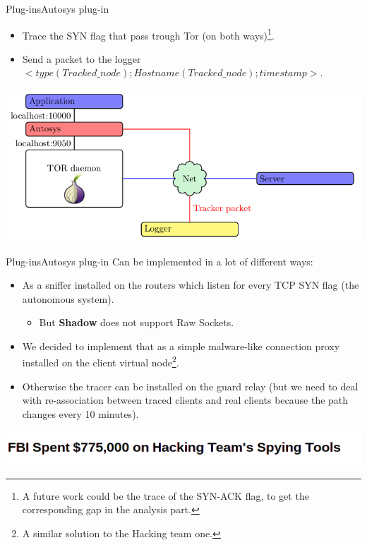 \begin{frame}{Plug-ins}{Autosys plug-in}
	\begin{itemize}
		\item Trace the SYN flag that pass trough Tor (on both ways)\footnote{
			        A future work could be the trace of the SYN-ACK flag,
		                to get the corresponding gap in the analysis part.}.
		\item Send a packet to the logger $< type(Tracked\_node) ; Hostname(Tracked\_node) ; timestamp >$.
	\end{itemize}
	\begin{center}
		\includegraphics[scale=0.3]{img/autosys.png}
	\end{center}
\end{frame}

\begin{frame}{Plug-ins}{Autosys plug-in}
	Can be implemented in a lot of different ways:
	\begin{itemize}
		\item As a sniffer installed on the routers which listen for
		      every TCP SYN flag (the autonomous system).
		\begin{itemize}
			\item But \textbf{Shadow} does not support Raw Sockets.
		\end{itemize}
		\item We decided to implement that as a simple malware-like connection proxy
		      installed on the client virtual node\footnote{A similar
		      solution to the Hacking team one.}.
		\item Otherwise the tracer can be installed on the guard relay
		      (but we need to deal with re-association between traced
		      clients and real clients because the path changes every
		      10 minutes).
	\end{itemize}
	\begin{center}
		\includegraphics[scale=0.4]{img/fbi.png}
	\end{center}
\end{frame}

